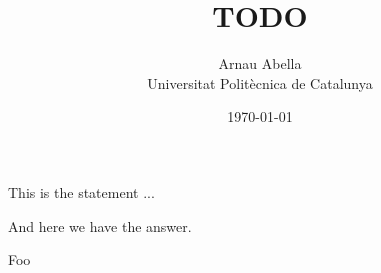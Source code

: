 \documentclass[12pt, a4paper]{article}
\title{%
  TODO
}
\author{%
  Arnau Abella \\
  \large{Universitat Polit\`ecnica de Catalunya}
}
\date{\today}
\begin{document}
\maketitle

\begin{Exercise}[number={16}]
  This is the statement ...
\end{Exercise}

\begin{Answer}
  And here we have the answer.
\end{Answer}

\begin{Exercise}[number={17}]
  Foo
\end{Exercise}

% 
% 
\end{document}
